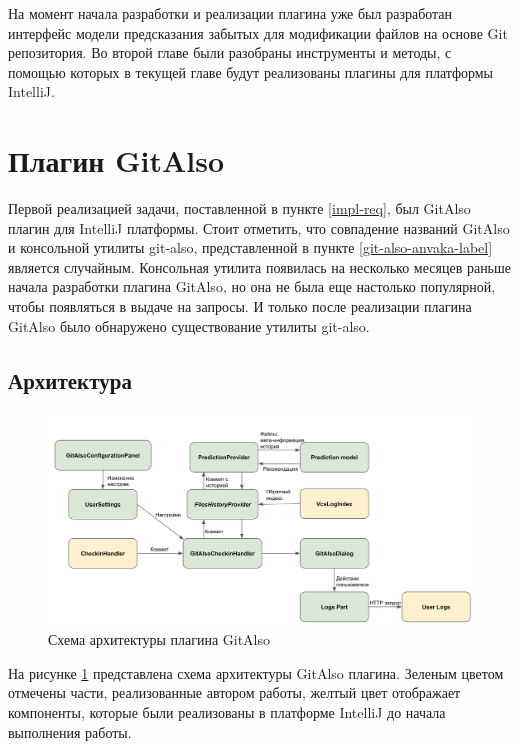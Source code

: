 На момент начала разработки и реализации плагина уже был разработан интерфейс модели предсказания забытых для модификации файлов на основе Git репозитория. Во второй главе были разобраны инструменты и методы, с помощью которых в текущей главе будут реализованы плагины для платформы IntelliJ.
\section{Плагин GitAlso}\label{git-also-main}
Первой реализацией задачи, поставленной в пункте \ref{impl-req}, был GitAlso плагин для IntelliJ платформы. Стоит отметить, что совпадение названий GitAlso и консольной утилиты git-also, представленной в пункте \ref{git-also-anvaka-label} является случайным. Консольная утилита появилась на несколько месяцев раньше начала разработки плагина GitAlso, но она не была еще настолько популярной, чтобы появляться в выдаче на запросы. И только после реализации плагина GitAlso было обнаружено существование утилиты git-also.
\subsection{Архитектура}
\begin{figure}[!h]
\caption{Схема архитектуры плагина GitAlso}\label{GitAlso-arch}
\centering
\includegraphics[scale=0.37]{images/GitAlsoArch.png}
\end{figure}
На рисунке \ref{GitAlso-arch} представлена схема архитектуры GitAlso плагина. Зеленым цветом отмечены части, реализованные автором работы, желтый цвет отображает компоненты, которые были реализованы в платформе IntelliJ до начала выполнения работы.

